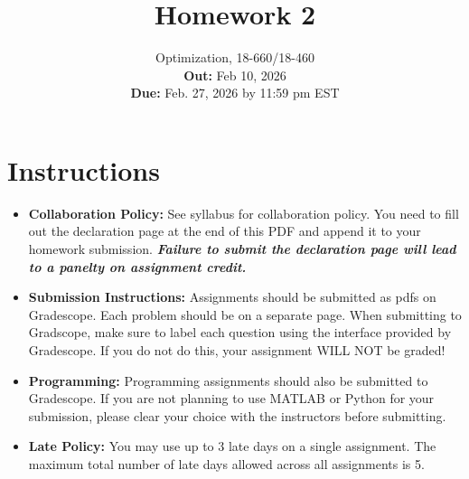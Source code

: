 \title{Homework 2}
\author{Optimization, 18-660/18-460 \\ \textbf{Out:} Feb 10, 2026 \\ \textbf{Due:}  Feb. 27, 2026 by 11:59 pm EST}
\date{}
\maketitle

\section*{Instructions}
\begin{itemize}
	\item \textbf{Collaboration Policy: } See syllabus for collaboration policy.
	      You need to fill out the declaration page at the end of this PDF and append it to your homework submission.
	      \textbf{\emph{Failure to submit the declaration page will lead to a panelty on assignment credit.}}
	\item \textbf{Submission Instructions: } Assignments should be submitted as pdfs on Gradescope.
	      Each problem should be on a separate page.
	      When submitting to Gradscope, make sure to label each question using the interface provided by Gradescope. If you do not do this, your assignment WILL NOT be graded!
	\item \textbf{Programming: } Programming assignments should also be submitted to Gradescope. If you are not planning to use MATLAB or Python for your submission, please clear your choice with the instructors before submitting.
	\item \textbf{Late Policy: } You may use up to 3 late days on a single assignment. The maximum total number of late days allowed across all assignments is 5.
\end{itemize}